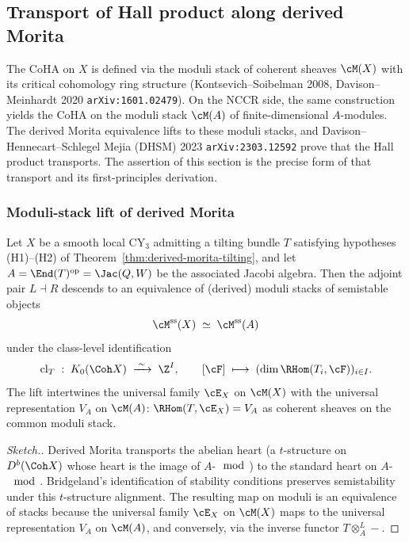 \subsection{Transport of Hall product along derived Morita}
\label{sec:hall-transport}

The CoHA on $X$ is defined via the moduli stack of coherent sheaves
$\cM(X)$ with its critical cohomology ring structure (Kontsevich--Soibelman
2008, Davison--Meinhardt 2020 \texttt{arXiv:1601.02479}). On the NCCR side, the
same construction yields the CoHA on the moduli stack $\cM(A)$ of
finite-dimensional $A$-modules. The derived Morita equivalence lifts to these
moduli stacks, and Davison--Hennecart--Schlegel Mejia (DHSM) 2023
\texttt{arXiv:2303.12592} prove that the Hall product transports. The
assertion of this section is the precise form of that transport and its
first-principles derivation.

\subsubsection{Moduli-stack lift of derived Morita}

\begin{theorem}
\label{thm:moduli-morita}
Let $X$ be a smooth local CY$_3$ admitting a tilting
bundle $T$ satisfying hypotheses (H1)--(H2) of
Theorem~\ref{thm:derived-morita-tilting}, and let $A = \End(T)^{\mathrm{op}} = \Jac(Q, W)$
be the associated Jacobi algebra. Then the adjoint pair $L \dashv R$ descends
to an equivalence of (derived) moduli stacks of semistable objects
\[
 \cM^{\mathrm{ss}}(X) \;\simeq\; \cM^{\mathrm{ss}}(A)
\]
under the class-level identification
\[
 \mathrm{cl}_T \;:\; K_0(\Coh X) \;\xrightarrow{\;\sim\;}\; \Z^{I}, \qquad
 [\cF] \;\longmapsto\; (\dim \RHom(T_i, \cF))_{i \in I}.
\]
The lift intertwines the universal family $\cE_X$ on $\cM(X)$ with the
universal representation $V_A$ on $\cM(A)$: $\RHom(T, \cE_X) = V_A$ as
coherent sheaves on the common moduli stack.
\end{theorem}

\begin{proof}[Sketch.]
Derived Morita transports the abelian heart (a $t$-structure on $D^b(\Coh X)$
whose heart is the image of $A$-$\mod$) to the standard heart on $A$-$\mod$.
Bridgeland's identification of stability conditions preserves semistability
under this $t$-structure alignment. The resulting map on moduli is an
equivalence of stacks because the universal family $\cE_X$ on $\cM(X)$ maps to
the universal representation $V_A$ on $\cM(A)$, and conversely, via the
inverse functor $T \otimes^L_A -$.
\end{proof}

